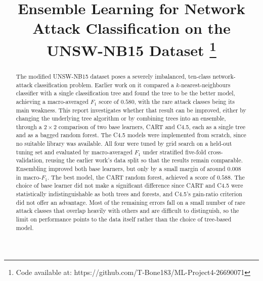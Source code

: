 \documentclass[conference]{IEEEtran}
\begin{document}

\title{Ensemble Learning for Network Attack Classification on the UNSW-NB15 Dataset
\thanks{Code available at: https://github.com/T-Bone183/ML-Project4-26690071}}

\author{
}

\maketitle

\begin{abstract} %
The modified UNSW-NB15 dataset poses a severely imbalanced, ten-class network-attack classification
problem. Earlier work on it compared a $k$-nearest-neighbours classifier with a single classification
tree and found the tree to be the better model, achieving a macro-averaged $F_1$ score of $0.580$, with
the rare attack classes being its main weakness. This report investigates whether that result can be
improved, either by changing the underlying tree algorithm or by combining trees into an ensemble,
through a $2\times2$ comparison of two base learners, CART and C4.5, each as a single tree and
as a bagged random forest. The C4.5 models were implemented from scratch, since no suitable library was
available. All four were tuned by grid search on a held-out tuning set and evaluated by macro-averaged
$F_1$ under stratified five-fold cross-validation, reusing the earlier work's data split
so that the results remain comparable. Ensembling improved both base learners, but only
by a small margin of around $0.008$ in macro-$F_1$. The
best model, the CART random forest, achieved a score of $0.588$. The choice of base learner did not make a significant
difference since CART and C4.5 were statistically indistinguishable as both trees and forests, and C4.5's
gain-ratio criterion did not offer an advantage. Most of the remaining errors fall on a small number of rare attack classes that overlap heavily with others and
are difficult to distinguish, so the limit on performance points to the data itself rather than the choice of
tree-based model.
\end{abstract}
\end{document}
